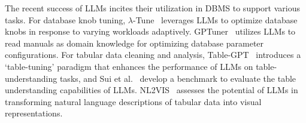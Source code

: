  The recent success of LLMs incites their utilization in DBMS to support various tasks.  
For database knob tuning, $\lambda$-Tune~\cite{DBLP:journals/pvldb/LaoWLWZCCTW24} leverages LLMs to optimize database knobs in response to varying workloads  adaptively. GPTuner~\cite{DBLP:conf/sigmod/GiannakourisT24} utilizes LLMs to read manuals as domain knowledge for optimizing database parameter configurations.
For tabular data cleaning and analysis, Table-GPT~\cite{DBLP:journals/pacmmod/LiHYCGZF0C24} 
introduces a `table-tuning' paradigm that enhances the performance of LLMs on table-understanding tasks, and Sui et al.~\cite{DBLP:conf/wsdm/SuiZZH024} develop a benchmark to evaluate the table understanding capabilities of LLMs. 
NL2VIS~\cite{DBLP:journals/pacmmod/Wu00SWZ0024} assesses the potential of LLMs in transforming natural language descriptions of tabular data into visual representations.  
